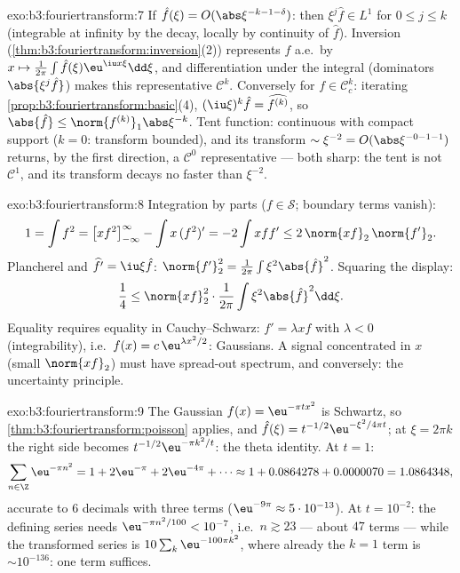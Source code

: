 \begin{solution}{exo:b3:fouriertransform:7}
If $\hat f(\xi) = O(\abs\xi^{-k-1-\delta})$: then $\xi^j\hat f
\in L^1$ for $0 \leq j \leq k$ (integrable at infinity by the
decay, locally by continuity of $\hat f$). Inversion
(\cref{thm:b3:fouriertransform:inversion}(2)) represents $f$
a.e.\ by $x \mapsto \frac1{2\pi}\int\hat f(\xi)\eu^{\iu
x\xi}\dd\xi$, and differentiation under the integral
(dominators $\abs{\xi^j\hat f}$) makes this representative
$\mathcal C^k$. Conversely for $f \in \mathcal C_c^k$:
iterating \cref{prop:b3:fouriertransform:basic}(4),
$(\iu\xi)^k\hat f = \widehat{f^{(k)}}$, so $\abs{\hat f} \leq
\norm{f^{(k)}}_1\abs\xi^{-k}$. Tent function: continuous with
compact support ($k = 0$: transform bounded), and its
transform $\sim \xi^{-2} = O(\abs\xi^{-0-1-1})$ returns, by
the first direction, a $\mathcal C^0$ representative --- both
sharp: the tent is not $\mathcal C^1$, and its transform
decays no faster than $\xi^{-2}$.
\end{solution}

\begin{solution}{exo:b3:fouriertransform:8}
Integration by parts ($f \in \mathcal S$; boundary terms
vanish):
\[
1 = \int f^2 = \bigl[xf^2\bigr]_{-\infty}^{\infty} - \int
x\,(f^2)' = -2\int xff' \leq 2\,\norm{xf}_2\,\norm{f'}_2 .
\]
Plancherel and $\widehat{f'} = \iu\xi\hat f$:
$\norm{f'}_2^2 = \frac1{2\pi}\int\xi^2\abs{\hat f}^2$. Squaring
the display:
\[
\frac14 \leq \norm{xf}_2^2\cdot\frac1{2\pi}
\int\xi^2\abs{\hat f}^2\dd\xi .
\]
Equality requires equality in Cauchy--Schwarz: $f' =
\lambda xf$ with $\lambda < 0$ (integrability), i.e.\ $f(x) =
c\,\eu^{\lambda x^2/2}$: Gaussians. A signal concentrated in
$x$ (small $\norm{xf}_2$) must have spread-out spectrum, and
conversely: the uncertainty principle.
\end{solution}

\begin{solution}{exo:b3:fouriertransform:9}
The Gaussian $f(x) = \eu^{-\pi tx^2}$ is Schwartz, so
\cref{thm:b3:fouriertransform:poisson} applies, and
$\hat f(\xi) = t^{-1/2}\eu^{-\xi^2/4\pi t}$; at $\xi = 2\pi
k$ the right side becomes $t^{-1/2}\eu^{-\pi k^2/t}$: the
theta identity. At $t = 1$:
\[
\sum_{n\in\Z}\eu^{-\pi n^2} = 1 + 2\eu^{-\pi} + 2\eu^{-4\pi} +
\cdots \approx 1 + 0.0864278 + 0.0000070 = 1.0864348,
\]
accurate to $6$ decimals with three terms ($\eu^{-9\pi}
\approx 5\cdot10^{-13}$). At $t = 10^{-2}$: the defining
series needs $\eu^{-\pi n^2/100} < 10^{-7}$, i.e.\ $n \gtrsim
23$ --- about $47$ terms --- while the transformed series is
$10\sum_k\eu^{-100\pi k^2}$, where already the $k = 1$ term is
$\sim 10^{-136}$: one term suffices.
\end{solution}

